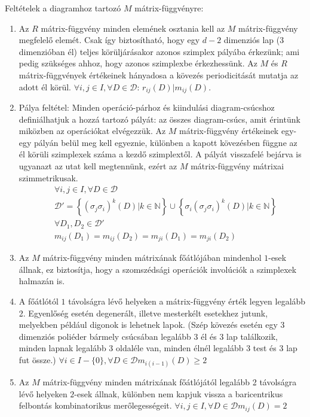 \documentclass[12pt,magyar,a4paper]{article}
\begin{document}
Feltételek a diagramhoz tartozó $M$ mátrix-függvényre:
\begin{enumerate}
  \item Az $R$ mátrix-függvény minden elemének osztania kell az $M$
    mátrix-függvény megfelelő elemét. Csak így biztosítható, hogy egy $d-2$
    dimenziós lap ($3$ dimenzióban él) teljes körüljárásakor azonos szimplex
    pályába érkezünk; ami pedig szükséges ahhoz, hogy azonos szimplexbe
    érkezhessünk. Az $M$ és $R$ mátrix-függvények értékeinek hányadosa a kövezés
    periodicitását mutatja az adott él körül. $\forall i,j\in I, \forall D\in
    \mathcal{D}$: $r_{ij}(D)|m_{ij}(D)$.
  \item Pálya feltétel: Minden operáció-párhoz és kiindulási diagram-csúcshoz
    definiálhatjuk a hozzá tartozó pályát: az összes diagram-csúcs, amit
    érintünk miközben az operációkat elvégezzük. Az $M$ mátrix-függvény
    értékeinek egy-egy pályán belül meg kell egyeznie, különben a kapott
    kövezésben függne az él körüli szimplexek száma a kezdő szimplextől. A
    pályát visszafelé bejárva is ugyanazt az utat kell megtennünk, ezért az $M$
    mátrix-függvény mátrixai szimmetrikusak.
    \begin{align*}                                                                             
      &\forall i,j\in I, \forall D\in \mathcal{D} \\
      &\mathcal{D}'=\left\{(\sigma_j\sigma_i)^k(D)|k\in
      \mathbb{N}\right\}\cup\left\{\sigma_i(\sigma_j\sigma_i)^k(D)|k\in
      \mathbb{N}\right\}\\
      &\forall D_1,D_2 \in \mathcal{D}'\\
      &m_{ij}(D_1)=m_{ij}(D_2)=m_{ji}(D_1)=m_{ji}(D_2)
    \end{align*}
  \item Az $M$ mátrix-függvény minden mátrixának főátlójában mindenhol $1$-esek
    állnak, ez biztosítja, hogy a szomszédsági operációk involúciók a szimplexek
    halmazán is.
  \item A főátlótól $1$ távolságra lévő helyeken a mátrix-függvény érték legyen
    legalább 2. Egyenlőség esetén degenerált, illetve mesterkélt esetekhez
    jutunk, melyekben például digonok is lehetnek lapok. (Szép kövezés esetén
    egy 3 dimenziós poliéder bármely csúcsában legalább 3 él és 3 lap
    találkozik, minden lapnak legalább 3 oldaléle van, minden élnél legalább 3
    test és 3 lap fut össze.)
    $\forall i\in I-\{0\}, \forall D\in \mathcal{D} m_{i(i-1)}(D)\geq 2$
  \item Az $M$ mátrix-függvény minden mátrixának főátlójától legalább 2
    távolságra lévő helyeken $2$-esek állnak, különben nem kapjuk vissza a
    baricentrikus felbontás kombinatorikus merőlegességeit.
    $\forall i,j\in I, \forall D\in \mathcal{D} m_{ij}(D)=2$
\end{enumerate}
\end{document}
